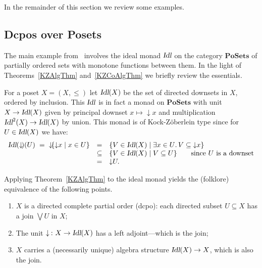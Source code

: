 \documentclass{LMCS}
\newif\ifignore \ignorefalse
\newcommand{\auxproof}[1]{
\ifignore\mbox{}\newline
\textbf{PROOF:} \dotfill\newline
{\it #1}\mbox{}\newline
\textbf{ENDPROOF}\dotfill
\fi}
\newcommand{\Cat}[1]{\ensuremath{\mathbf{#1}}}
\newcommand{\Idl}{\textsl{Idl}\xspace}
\newcommand{\PoSets}{\Cat{PoSets}\xspace}
\newcommand{\set}[2]{\{#1\;|\;#2\}}
\newcommand{\setin}[3]{\{#1\in#2\;|\;#3\}}
\newcommand{\exin}[3]{\exists{#1\in#2}.\,#3}
\newcommand{\downset}{\mathop{\downarrow}\!}
\renewcommand{\arraycolsep}{3pt}
\begin{document}
In the remainder of this section we review some examples.


\subsection{Dcpos over Posets}\label{DcpoSubsec}

The main example from~\cite{Jacobs94b} involves the ideal monad $\Idl$
on the category \PoSets of partially ordered sets with monotone
functions between them. In the light of Theorems~\ref{KZAlgThm}
and~\ref{KZCoAlgThm} we briefly review the essentials.

For a poset $X = (X,\leq)$ let $\Idl(X)$ be the set of directed
downsets in $X$, ordered by inclusion. This $\Idl$ is in fact a monad
on \PoSets with unit $X\rightarrow\Idl(X)$ given by principal downset
$x\mapsto\downset x$ and multiplication $\Idl^{2}(X) \rightarrow
\Idl(X)$ by union.  This monad is of Kock-Z{\"o}berlein type since for
$U\in\Idl(X)$ we have:
$$\begin{array}{rcl}
\Idl(\downset)(U)
\hspace*{\arraycolsep}=\hspace*{\arraycolsep}
\downset\set{\downset x}{x\in U}
& = &
\setin{V}{\Idl(X)}{\exin{x}{U}{V\subseteq \downset x}} \\
& \subseteq &
\setin{V}{\Idl(X)}{V\subseteq U} \qquad
    \mbox{since $U$ is a downset} \\
& = &
\downset U.
\end{array}$$

\auxproof{
For a poset $(X,\leq)$ a subset $U\subseteq X$ is called directed if
it is non-empty and for each pair $x_{1},x_{2}\in U$ there is a $y\in
U$ with $x_{1},x_{2}\leq y$. The set $\Idl(X)$ contains the downclosed
directed subsets, ordered by inclusion. The mapping $X \mapsto
\Idl(X)$ yields a functor $\PoSets \rightarrow \PoSets$: for $f\colon
X\rightarrow Y$ one defines $\Idl(f)(U) = \downset\set{f(x)}{x\in U}$.
}

\noindent Applying Theorem~\ref{KZAlgThm} to the ideal monad yields the
(folklore) equivalence of the following points.
\begin{enumerate}[(1)]
\item $X$ is a directed complete partial order (dcpo): each directed
  subset $U\subseteq X$ has a join $\bigvee U$ in $X$; 

\item The unit $\downset\; \colon  X \rightarrow  \Idl(X)$
  has a left adjoint---which is the join;

\item $X$ carries a (necessarily unique) algebra structure $\Idl(X)
  \rightarrow X$, which is also the join. 
\end{enumerate}
\end{document}
